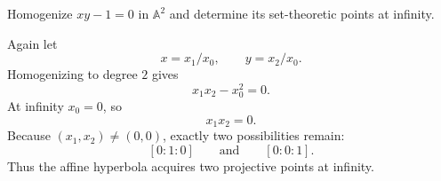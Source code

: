 \begin{problem}\label{prob:vi36-11}
Homogenize \(xy-1=0\) in \(\mathbb A^2\) and determine its set-theoretic points at infinity.
\end{problem}

\ifdefined\FullProblemDossiers
\begin{solution}
Again let
\[
x=x_1/x_0,
\qquad
y=x_2/x_0.
\]
Homogenizing to degree \(2\) gives
\[
\boxed{x_1x_2-x_0^2=0}.
\]
At infinity \(x_0=0\), so
\[
x_1x_2=0.
\]
Because \((x_1,x_2)\neq(0,0)\), exactly two possibilities remain:
\[
\boxed{[0:1:0]}
\qquad\text{and}\qquad
\boxed{[0:0:1]}.
\]
Thus the affine hyperbola acquires two projective points at infinity.
\end{solution}
\fi
